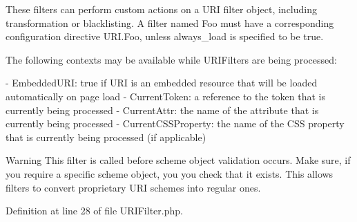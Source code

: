 These filters can perform custom actions on a U\+R\+I filter object, including transformation or blacklisting. A filter named Foo must have a corresponding configuration directive U\+R\+I.\+Foo, unless always\+\_\+load is specified to be true.

The following contexts may be available while U\+R\+I\+Filters are being processed\+: \begin{DoxyVerb} - EmbeddedURI: true if URI is an embedded resource that will
   be loaded automatically on page load
 - CurrentToken: a reference to the token that is currently
   being processed
 - CurrentAttr: the name of the attribute that is currently being
   processed
 - CurrentCSSProperty: the name of the CSS property that is
   currently being processed (if applicable)
\end{DoxyVerb}


\begin{DoxyWarning}{Warning}
This filter is called before scheme object validation occurs. Make sure, if you require a specific scheme object, you you check that it exists. This allows filters to convert proprietary U\+R\+I schemes into regular ones. 
\end{DoxyWarning}


Definition at line 28 of file U\+R\+I\+Filter.\+php.



